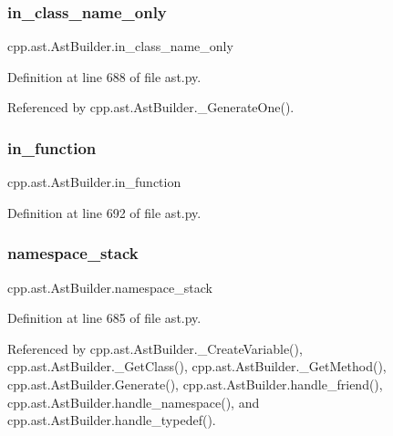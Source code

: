 \subsubsection{\texorpdfstring{in\+\_\+class\+\_\+name\+\_\+only}{in\_class\_name\_only}}
{\footnotesize\ttfamily cpp.\+ast.\+Ast\+Builder.\+in\+\_\+class\+\_\+name\+\_\+only}



Definition at line 688 of file ast.\+py.



Referenced by cpp.\+ast.\+Ast\+Builder.\+\_\+\+Generate\+One().

\mbox{\label{classcpp_1_1ast_1_1AstBuilder_ad5ac0612dfff44241033864832dbdfe3}} 
\subsubsection{\texorpdfstring{in\+\_\+function}{in\_function}}
{\footnotesize\ttfamily cpp.\+ast.\+Ast\+Builder.\+in\+\_\+function}



Definition at line 692 of file ast.\+py.

\mbox{\label{classcpp_1_1ast_1_1AstBuilder_ab183aa48e4b6e116379f95eb3d11039c}} 
\subsubsection{\texorpdfstring{namespace\+\_\+stack}{namespace\_stack}}
{\footnotesize\ttfamily cpp.\+ast.\+Ast\+Builder.\+namespace\+\_\+stack}



Definition at line 685 of file ast.\+py.



Referenced by cpp.\+ast.\+Ast\+Builder.\+\_\+\+Create\+Variable(), cpp.\+ast.\+Ast\+Builder.\+\_\+\+Get\+Class(), cpp.\+ast.\+Ast\+Builder.\+\_\+\+Get\+Method(), cpp.\+ast.\+Ast\+Builder.\+Generate(), cpp.\+ast.\+Ast\+Builder.\+handle\+\_\+friend(), cpp.\+ast.\+Ast\+Builder.\+handle\+\_\+namespace(), and cpp.\+ast.\+Ast\+Builder.\+handle\+\_\+typedef().

